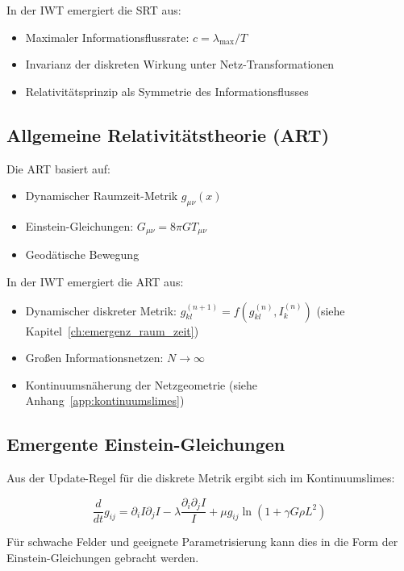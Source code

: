 In der IWT emergiert die SRT aus:

\begin{itemize}
    \item Maximaler Informationsflussrate: \( c = \lambda_{\max}/T \)
    \item Invarianz der diskreten Wirkung unter Netz-Transformationen
    \item Relativitätsprinzip als Symmetrie des Informationsflusses
\end{itemize}

\subsection{Allgemeine Relativitätstheorie (ART)}
\label{sub:vergleich_art}

Die ART basiert auf:

\begin{itemize}
    \item Dynamischer Raumzeit-Metrik \( g_{\mu\nu}(x) \)
    \item Einstein-Gleichungen: \( G_{\mu\nu} = 8\pi G T_{\mu\nu} \)
    \item Geodätische Bewegung
\end{itemize}

In der IWT emergiert die ART aus:

\begin{itemize}
    \item Dynamischer diskreter Metrik: \( g_{kl}^{(n+1)} = f(g_{kl}^{(n)}, I_k^{(n)}) \) (siehe Kapitel~\ref{ch:emergenz_raum_zeit})
    \item Großen Informationsnetzen: \( N \to \infty \)
    \item Kontinuumsnäherung der Netzgeometrie (siehe Anhang~\ref{app:kontinuumslimes})
\end{itemize}

\subsection{Emergente Einstein-Gleichungen}
\label{sub:vergleich_einstein}

Aus der Update-Regel für die diskrete Metrik ergibt sich im Kontinuumslimes:

\[
\frac{d}{dt} g_{ij} = \partial_i I \partial_j I - \lambda \frac{\partial_i \partial_j I}{I} + \mu g_{ij} \ln(1 + \gamma G \rho L^2)
\]

Für schwache Felder und geeignete Parametrisierung kann dies in die Form der Einstein-Gleichungen gebracht werden.

